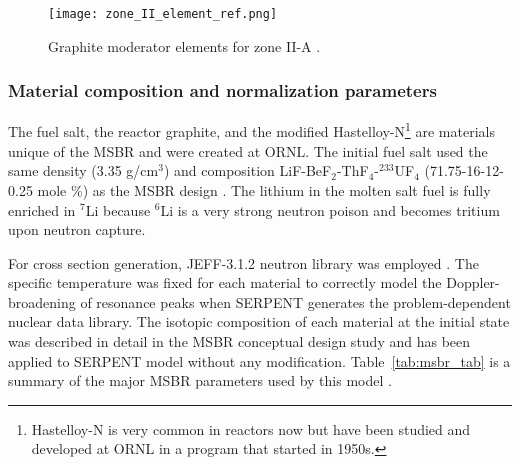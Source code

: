 \begin{figure}[ht!] %
  \centering
  \texttt{[image: zone\_II\_element\_ref.png]}
  \caption{Graphite moderator elements for zone II-A \cite{robertson_conceptual_1971,rykhlevskii_full-core_2017}.}
  \label{fig:II_element_ref}
\end{figure}

\subsubsection{Material composition and normalization parameters}
The fuel salt, the reactor graphite, and the modified Hastelloy-N\footnote{ Hastelloy-N is very common in reactors now but have been studied and developed at \gls{ORNL} in a program that started in 1950s.} are materials unique of the \gls{MSBR} and were created at \gls{ORNL}. The initial fuel salt used the same density (3.35 g/cm$^3$) and composition LiF-BeF$_2$-ThF$_4$-$^{233}$UF$_4$ (71.75-16-12-0.25 mole \%) as the \gls{MSBR} design \cite{robertson_conceptual_1971}. The lithium in the molten salt fuel is fully enriched in $^{7}$Li because $^{6}$Li is a very strong neutron poison and becomes tritium upon neutron capture. 

For cross section generation, JEFF-3.1.2 neutron library was employed \cite{oecd/nea_data_bank_jeff-3.1.2_2014}. The specific temperature was fixed for each material to correctly model the Doppler-broadening of resonance peaks when SERPENT generates the problem-dependent nuclear data library. The isotopic composition of each material at the initial state was described in detail in the MSBR conceptual design study \cite{robertson_conceptual_1971} and has been applied to SERPENT model without any modification. Table~\ref{tab:msbr_tab} is a summary of the major \gls{MSBR} parameters used by this model \cite{robertson_conceptual_1971}. 

